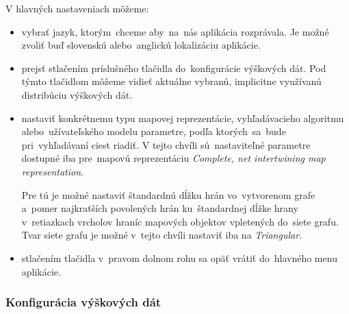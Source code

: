 \documentclass[12pt,a4paper]{report}
\begin{document}
\begin{figure}[h]\centering
{}
\end{figure}

V hlavných nastaveniach môžeme:
\begin{itemize}
    \item vybrať jazyk, ktorým~chceme aby~na~nás aplikácia rozprávala. Je možné zvoliť buď slovenskú alebo~anglickú lokalizáciu aplikácie.
    \item prejsť stlačením príslušného tlačidla do~konfigurácie výškových dát. Pod týmto tlačidlom môžeme vidieť aktuálne vybranú, implicitne využívanú distribúciu výškových dát.
    \item nastaviť konkrétnemu typu mapovej reprezentácie, vyhľadávacieho algoritmu alebo~užívateľského modelu parametre, podľa ktorých~sa~bude pri~vyhľadávaní ciest riadiť. V tejto chvíli sú~nastaviteľné parametre dostupné iba pre~mapovú reprezentáciu \textit{Complete, net intertwining map representation}. 
    
    Pre tú je možné nastaviť štandardnú dĺžku hrán vo~vytvorenom grafe a~pomer najkratších povolených hrán ku~štandardnej dĺžke hrany v~retiazkach vrcholov hraníc mapových objektov vpletených do~siete grafu. Tvar siete grafu je možné v~tejto chvíli nastaviť iba na \textit{Triangular}. 
    \item stlačením tlačidla v~pravom dolnom rohu sa opäť vrátiť do~hlavného menu aplikácie.
\end{itemize}

\subsubsection{Konfigurácia výškových dát}

\begin{figure}[h]\centering
{}
\end{figure}
\end{document}
